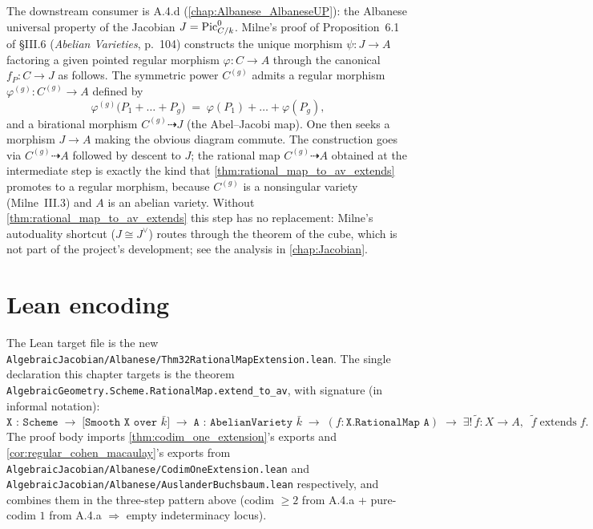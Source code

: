 The downstream consumer is A.4.d (\cref{chap:Albanese_AlbaneseUP}):
the Albanese universal property of the Jacobian \(J = \operatorname{Pic}^0_{C/k}\). Milne's proof of
Proposition~6.1 of \S III.6 (\emph{Abelian Varieties}, p.~104) constructs the unique
morphism \(\psi \colon J \to A\) factoring a given pointed regular morphism
\(\varphi \colon C \to A\) through the canonical \(f_P \colon C \to J\) as follows. The
symmetric power \(C^{(g)}\) admits a regular morphism \(\varphi^{(g)} \colon C^{(g)} \to A\)
defined by
\[
  \varphi^{(g)}\bigl(P_1 + \dots + P_g\bigr) \;=\; \varphi(P_1) + \dots + \varphi(P_g),
\]
and a birational morphism \(C^{(g)} \dashrightarrow J\) (the Abel--Jacobi map). One then
seeks a morphism \(J \to A\) making the obvious diagram commute. The construction goes via
\(C^{(g)} \dashrightarrow A\) followed by descent to \(J\); the rational map
\(C^{(g)} \dashrightarrow A\) obtained at the intermediate step is exactly the kind that
\cref{thm:rational_map_to_av_extends} promotes to a regular morphism, because \(C^{(g)}\) is
a nonsingular variety (Milne~III.3) and \(A\) is an abelian variety. Without
\cref{thm:rational_map_to_av_extends} this step has no replacement: Milne's autoduality
shortcut (\(J \cong J^\vee\)) routes through the theorem of the cube, which is not part of
the project's development; see the analysis in \cref{chap:Jacobian}.

\section{Lean encoding}
\label{sec:thm32_lean_encoding}

The Lean target file is the new
\texttt{AlgebraicJacobian/Albanese/Thm32RationalMapExtension.lean}. The single declaration
this chapter targets is the theorem
\texttt{AlgebraicGeometry.Scheme.RationalMap.extend\_to\_av}, with signature (in informal
notation):
\[
  \texttt{X : Scheme} \;\to\; \texttt{[Smooth X over \(\bar k\)]} \;\to\;
  \texttt{A : AbelianVariety \(\bar k\)} \;\to\;
  (f : \texttt{X.RationalMap A}) \;\to\;
  \exists ! \, \widetilde f \colon X \to A, \;\; \widetilde f \;\text{extends}\; f.
\]
The proof body imports \cref{thm:codim_one_extension}'s exports and
\cref{cor:regular_cohen_macaulay}'s exports from
\texttt{AlgebraicJacobian/Albanese/CodimOneExtension.lean} and
\texttt{AlgebraicJacobian/Albanese/AuslanderBuchsbaum.lean} respectively, and combines them
in the three-step pattern above (codim \(\geq 2\) from A.4.a + pure-codim \(1\) from A.4.a
\(\Rightarrow\) empty indeterminacy locus).

